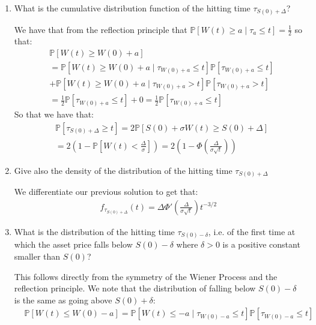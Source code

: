\documentclass[12pt,twoside, letter]{exam}
\theoremstyle{definition}
\newcommand{\pp}{\mathbb{P}}
\begin{document}
\begin{enumerate}
  \item What is the cumulative distribution function of the hitting time $\tau_{S(0)+\Delta}$?
    \begin{solution}
      We have that from the reflection principle that $\pp[W(t) \geq a \mid \tau_{a} \leq t] = \frac{1}{2}$ so that:
      \begin{align*}
        &\pp[W(t) \geq W(0) + a] \\
        &= \pp[W(t) \geq W(0) + a \mid \tau_{W(0)+a} \leq t] \pp[\tau_{W(0)+a} \leq t] \\
        &+ \pp[W(t) \geq W(0) + a \mid \tau_{W(0)+a} > t] \pp[\tau_{W(0)+a} > t] \\
        &= \frac{1}{2} \pp[\tau_{W(0)+a} \leq t] + 0 = \frac{1}{2}\pp[\tau_{W(0)+a} \leq t]
      \end{align*}
      So that we have that:
      \begin{align*}
        &\pp[\tau_{S(0)+\Delta} \geq t] = 2\pp[S(0) + \sigma W(t) \geq S(0) + \Delta] \\
        &= 2(1 - \pp[W(t) < \frac{\Delta}{\sigma}]) = 2(1 - \Phi(\frac{\Delta}{\sigma\sqrt{t}}))
      \end{align*}
    \end{solution}
  \item Give also the density of the distribution of the hitting time $\tau_{S(0)+\Delta}$
    \begin{solution}
      We differentiate our previous solution to get that:
      \begin{align*}
        f_{\tau_{S(0)+\Delta}}(t) = \Delta \Phi'(\frac{\Delta}{\sigma\sqrt{t}}) t^{-3/2}
      \end{align*}
    \end{solution}
  \item What is the distribution of the hitting time $\tau_{S(0) - \delta}$, i.e. of the first time at which the asset price falls below $S(0) - \delta$
    where $\delta > 0$ is a positive constant smaller than $S(0)$?
      \begin{solution}
        This follows directly from the symmetry of the Wiener Process and the reflection principle. We note that the distribution of falling below $S(0) - \delta$ is
        the same as going above $S(0) + \delta$:
        \begin{align*}
          &\pp[W(t) \leq W(0) - a] = \pp[W(t) \leq -a \mid \tau_{W(0) - a} \leq t] \pp[\tau_{W(0) - a} \leq t] \\

\end{align*}
\end{solution}
\end{enumerate}
\end{document}
